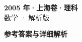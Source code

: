 \documentclass[zihao=-4, a4paper]{ctexart}
\begin{document}
\begin{center}
  {\Large\bfseries 2005 年·上海卷·理科}\\[4pt]
  {\large 数学 · 解析版}
\end{center}
\medskip
{}

\clearpage
{}
\begin{center}{\Large\bfseries 参考答案与详细解析}\end{center}
\medskip

\end{document}
